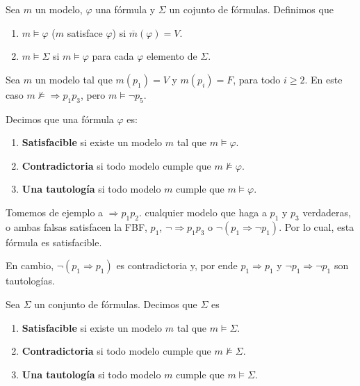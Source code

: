 \documentclass[12pt]{report}
\theoremstyle{largebreak}
\begin{document}
    \begin{mydef}
        Sea $m$ un modelo, $\varphi$ una fórmula y $\Sigma$ un cojunto de fórmulas. Definimos que
        \begin{enumerate}
            \item $m\vDash \varphi$ ($m$ satisface $\varphi$) si $\overline{m}(\varphi)=V$.
            \item $m\vDash \Sigma$ si $m\vDash\varphi$ para cada $\varphi$ elemento de $\Sigma$.
        \end{enumerate}
    \end{mydef}

    \begin{exa}
        Sea $m$ un modelo tal que $m(p_1)=V$ y $m(p_i)=F$, para todo $i\geq2$. En este caso $m\nvDash \Rightarrow p_1p_3$, pero $m\vDash \neg p_5$.
    \end{exa}
    
    \begin{mydef}
        Decimos que una fórmula $\varphi$ es:
        \begin{enumerate}
            \item \textbf{Satisfacible} si existe un modelo $m$ tal que $m\vDash\varphi$.
            \item \textbf{Contradictoria} si todo modelo cumple que $m\nvDash\varphi$.
            \item \textbf{Una tautología} si todo modelo $m$ cumple que $m\vDash\varphi$.
        \end{enumerate}
    \end{mydef}

    \begin{exa}
        Tomemos de ejemplo a $\Rightarrow p_1 p_2$. cualquier modelo que haga a $p_1$ y $p_3$ verdaderas, o ambas falsas satisfacen la FBF, $p_1$, $\neg\Rightarrow p_1 p_3$ o $\neg(p_1\Rightarrow\neg p_1)$. Por lo cual, esta fórmula es satisfacible.

        En cambio, $\neg(p_1\Rightarrow p_1)$ es contradictoria y, por ende $p_1\Rightarrow p_1$ y $\neg p_1\Rightarrow\neg p_1$ son tautologías.
    \end{exa}

    \begin{mydef}
        Sea $\Sigma$ un conjunto de fórmulas. Decimos que $\Sigma$ es
        \begin{enumerate}
            \item \textbf{Satisfacible} si existe un modelo $m$ tal que $m\vDash\Sigma$.
            \item \textbf{Contradictoria} si todo modelo cumple que $m\nvDash\Sigma$.
            \item \textbf{Una tautología} si todo modelo $m$ cumple que $m\vDash\Sigma$.
        \end{enumerate}
    \end{mydef}
\end{document}
